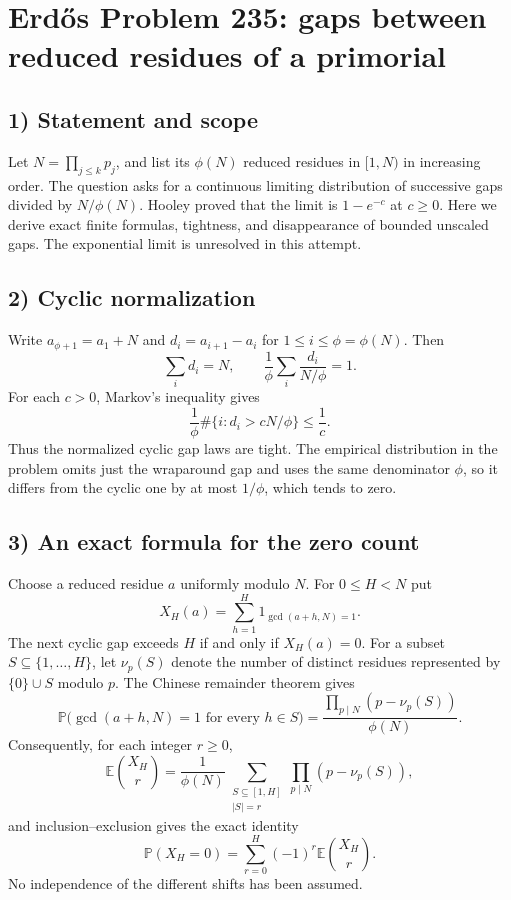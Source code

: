 \section{Erd\H{o}s Problem 235: gaps between reduced residues of a primorial}

\subsection{1) Statement and scope}
Let $N=\prod_{j\leq k}p_j$, and list its $\phi(N)$ reduced residues
in $[1,N)$ in increasing order. The question asks for a continuous
limiting distribution of successive gaps divided by $N/\phi(N)$.
Hooley proved that the limit is $1-e^{-c}$ at $c\geq0$.
Here we derive exact finite formulas, tightness, and disappearance
of bounded unscaled gaps. The exponential limit is unresolved
in this attempt.

\subsection{2) Cyclic normalization}
Write $a_{\phi+1}=a_1+N$ and
$d_i=a_{i+1}-a_i$ for $1\leq i\leq\phi=\phi(N)$.
Then
\[
 \sum_i d_i=N,\qquad
 \frac1\phi\sum_i\frac{d_i}{N/\phi}=1.
\]
For each $c>0$, Markov's inequality gives
\[
 \frac1\phi\#\{i:d_i>cN/\phi\}\leq\frac1c.
\]
Thus the normalized cyclic gap laws are tight. The empirical
distribution in the problem omits just the wraparound gap and
uses the same denominator $\phi$, so it differs from the cyclic
one by at most $1/\phi$, which tends to zero.

\subsection{3) An exact formula for the zero count}
Choose a reduced residue $a$ uniformly modulo $N$. For $0\leq H<N$
put
\[
 X_H(a)=\sum_{h=1}^H1_{\gcd(a+h,N)=1}.
\]
The next cyclic gap exceeds $H$ if and only if $X_H(a)=0$.
For a subset $S\subseteq\{1,\ldots,H\}$, let
$\nu_p(S)$ denote the number of distinct residues represented by
$\{0\}\cup S$ modulo $p$. The Chinese remainder theorem gives
\[
 \mathbb P\bigl(\gcd(a+h,N)=1\text{ for every }h\in S\bigr)
   =\frac{\prod_{p\mid N}(p-\nu_p(S))}{\phi(N)}.
\]
Consequently, for each integer $r\geq0$,
\[
 \mathbb E\binom{X_H}{r}
  =\frac1{\phi(N)}
    \sum_{\substack{S\subseteq[1,H]\\|S|=r}}
       \prod_{p\mid N}(p-\nu_p(S)),
\]
and inclusion--exclusion gives the exact identity
\[
 \mathbb P(X_H=0)
   =\sum_{r=0}^H(-1)^r\mathbb E\binom{X_H}{r}.
\]
No independence of the different shifts has been assumed.

